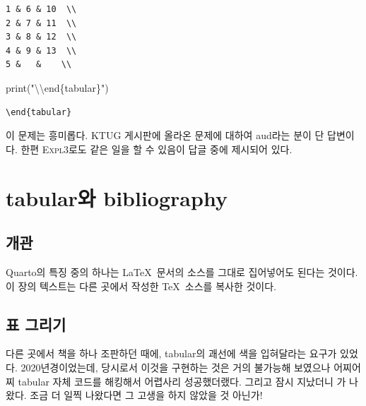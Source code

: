 \documentclass[
  chapter,a4paper,showtrims,openright,hidelinks]{oblivoir}
\newenvironment{Shaded}{\begin{snugshade}}{\end{snugshade}}
\newcommand{\BuiltInTok}[1]{\textcolor[rgb]{0.00,0.23,0.31}{#1}}
\newcommand{\CharTok}[1]{\textcolor[rgb]{0.13,0.47,0.30}{#1}}
\newcommand{\NormalTok}[1]{\textcolor[rgb]{0.00,0.23,0.31}{#1}}
\newcommand{\SpecialCharTok}[1]{\textcolor[rgb]{0.37,0.37,0.37}{#1}}
\newcommand{\StringTok}[1]{\textcolor[rgb]{0.13,0.47,0.30}{#1}}
\begin{document}
\begin{verbatim}
1 & 6 & 10  \\
2 & 7 & 11  \\
3 & 8 & 12  \\
4 & 9 & 13  \\
5 &   &    \\
\end{verbatim}

\begin{Shaded}
\begin{Highlighting}[]
\BuiltInTok{print}\NormalTok{(}\StringTok{"}\CharTok{\textbackslash{}\textbackslash{}}\StringTok{end}\SpecialCharTok{\{tabular\}}\StringTok{"}\NormalTok{)}
\end{Highlighting}
\end{Shaded}

\begin{verbatim}
\end{tabular}
\end{verbatim}

이 문제는 흥미롭다. KTUG 게시판에 올라온 문제에 대하여 aud라는 분이 단
답변이다. 한편 \textsc{Expl3}로도 같은 일을 할 수 있음이 답글 중에
제시되어 있다.

\hypertarget{tabularuxc640-bibliography}{%
\chapter{tabular와 bibliography}\label{tabularuxc640-bibliography}}

\hypertarget{uxac1cuxad00}{%
\section{개관}\label{uxac1cuxad00}}

Quarto의 특징 중의 하나는 \LaTeX~문서의 소스를 그대로 집어넣어도 된다는
것이다. 이 장의 텍스트는 다른 곳에서 작성한 \TeX~소스를 복사한 것이다.

\hypertarget{uxd45c-uxadf8uxb9acuxae30}{%
\section{표 그리기}\label{uxd45c-uxadf8uxb9acuxae30}}

다른 곳에서 책을 하나 조판하던 때에, tabular의 괘선에 색을 입혀달라는
요구가 있었다. 2020년경이었는데, 당시로서 이것을 구현하는
것은 거의 불가능해 보였으나 어찌어찌 tabular 자체 코드를 해킹해서
어렵사리 성공했더랬다. 그리고 잠시 지났더니 가 나왔다.
조금 더 일찍 나왔다면 그 고생을 하지 않았을 것 아닌가!
\end{document}
